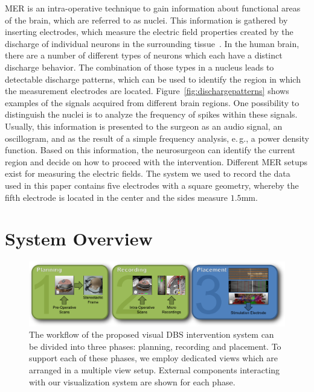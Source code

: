 \documentclass[journal]{vgtc}                %
\begin{document}
MER is an intra-operative technique to gain information about functional areas of the brain, which are referred to as nuclei. This information is gathered by inserting electrodes, which measure the electric field properties created by the discharge of individual neurons in the surrounding tissue~\cite{McIntyre2006}. In the human brain, there are a number of different types of neurons which each have a distinct discharge behavior. The combination of those types in a nucleus leads to detectable discharge patterns, which can be used to identify the region in which the measurement electrodes are located. Figure~\ref{fig:dischargepatterns} shows examples of the signals acquired from different brain regions. One possibility to distinguish the nuclei is to analyze the frequency of spikes within these signals. Usually, this information is presented to the surgeon as an audio signal, an oscillogram, and as the result of a simple frequency analysis, e.\,g., a power density function. Based on this information, the neurosurgeon can identify the current region and decide on how to proceed with the intervention. Different MER setups exist for measuring the electric fields. The system we used to record the data used in this paper contains five electrodes with a square geometry, whereby the fifth electrode is located in the center and the sides measure $1.5$mm.




\section{System Overview}\label{sec:overview}
\begin{figure}[t]
    \centering
    \includegraphics[width=0.9\linewidth]{figures/workflow}
    \caption{The workflow of the proposed visual DBS intervention system can be divided into three phases: planning, recording and placement. To support each of these phases, we employ dedicated views which are arranged in a multiple view setup. External components interacting with our visualization system are shown for each phase.}
    \label{fig:workflow}
\end{figure}
\end{document}
